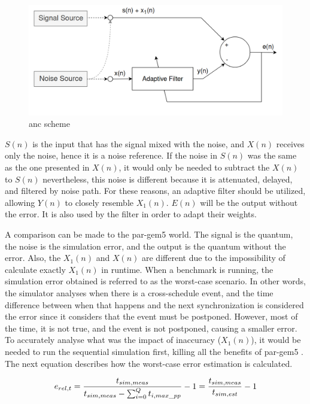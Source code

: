 \begin{figure}[H]
	\centering
 	\includegraphics[width=0.7\linewidth]{Images/AdaptiveNoiseCancellationScheme.png}
 	\caption{\gls{anc} scheme}
	 \label{fig_AdaptiveNoiseCancellationScheme}
\end{figure}

$S(n)$ is the input that has the signal mixed with the noise, and $X(n)$ receives only the noise, hence it is a noise reference. If the noise 
in $S(n)$ was the same as the one presented in $X(n)$, it would only be needed to subtract the $X(n)$ to $S(n)$ nevertheless, this noise is 
different because it is attenuated, delayed, and filtered by noise path. For these reasons, an adaptive filter should be utilized, allowing 
$Y(n)$ to closely resemble $X_{1}(n)$. $E(n)$ will be the output without the error. It is also used by the filter in order to adapt their weights.

A comparison can be made to the par-gem5 world. The signal is the quantum, the noise is the simulation error, and the output is the quantum 
without the error. Also, the $X_{1}(n)$ and $X(n)$ are different due to the impossibility of calculate exactly $X_{1}(n)$ in runtime. When a 
benchmark is running, the simulation error obtained is referred to as the worst-case scenario. In other words, the simulator analyses when there 
is a cross-schedule event, and the time difference between when that happens and the next synchronization is considered the error since it 
considers that the event must be postponed. However, most of the time, it is not true, and the event is not postponed, causing a smaller error. To 
accurately analyse what was the impact of inaccuracy ($X_{1}(n)$), it would be needed to run the sequential simulation first, killing 
all the benefits of par-gem5 \cite{pargem5}. The next equation describes how the worst-case error estimation is calculated. 

\begin{equation}
    \label{eq_errSim}
    \centering
        \Large
        e_{rel,t} = \frac{t_{sim,meas}}{t_{sim,meas}-\sum_{i=0}^{Q}t_{i,max\_pp}} -1  = \frac{t_{sim,meas}}{t_{sim,est}}-1
        \normalsize
\end{equation}
\vspace{0.3cm}

